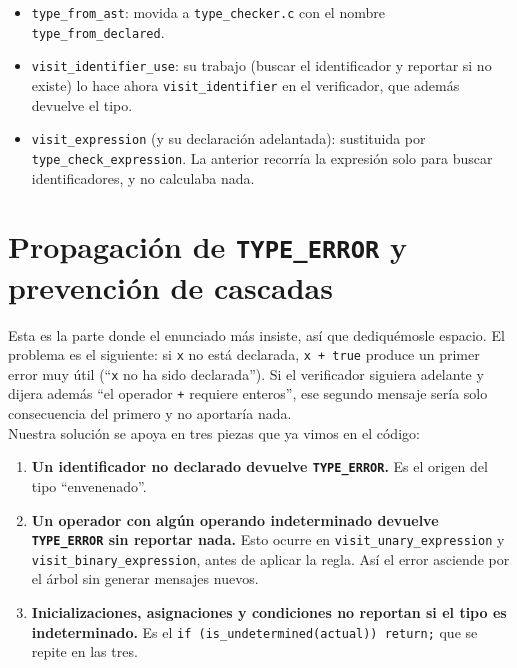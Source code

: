 \documentclass[12pt,letterpaper]{article}
\begin{document}
\begin{itemize}
\item \texttt{type\_from\_ast}: movida a \texttt{type\_checker.c} con el nombre \texttt{type\_from\_declared}.
\item \texttt{visit\_identifier\_use}: su trabajo (buscar el identificador y reportar si no existe) lo hace ahora
  \texttt{visit\_identifier} en el verificador, que además devuelve el tipo.
\item \texttt{visit\_expression} (y su declaración adelantada): sustituida por \texttt{type\_check\_expression}.
  La anterior recorría la expresión solo para buscar identificadores, y no calculaba nada.
\end{itemize}

\section*{Propagación de \texttt{TYPE\_ERROR} y prevención de cascadas}

Esta es la parte donde el enunciado más insiste, así que dediquémosle espacio. El problema es el siguiente:
si \texttt{x} no está declarada, \texttt{x + true} produce un primer error muy útil (``\texttt{x} no ha sido
declarada''). Si el verificador siguiera adelante y dijera además ``el operador \texttt{+} requiere enteros'', ese
segundo mensaje sería solo consecuencia del primero y no aportaría nada.\\

Nuestra solución se apoya en tres piezas que ya vimos en el código:

\begin{enumerate}[label=\arabic*.]
\item \textbf{Un identificador no declarado devuelve \texttt{TYPE\_ERROR}.} Es el origen del tipo ``envenenado''.

\item \textbf{Un operador con algún operando indeterminado devuelve \texttt{TYPE\_ERROR} sin reportar nada.}
  Esto ocurre en \texttt{visit\_unary\_expression} y \texttt{visit\_binary\_expression}, antes de aplicar la
  regla. Así el error asciende por el árbol sin generar mensajes nuevos.

\item \textbf{Inicializaciones, asignaciones y condiciones no reportan si el tipo es indeterminado.} Es el
  \texttt{if (is\_undetermined(actual)) return;} que se repite en las tres.
\end{enumerate}
\end{document}
